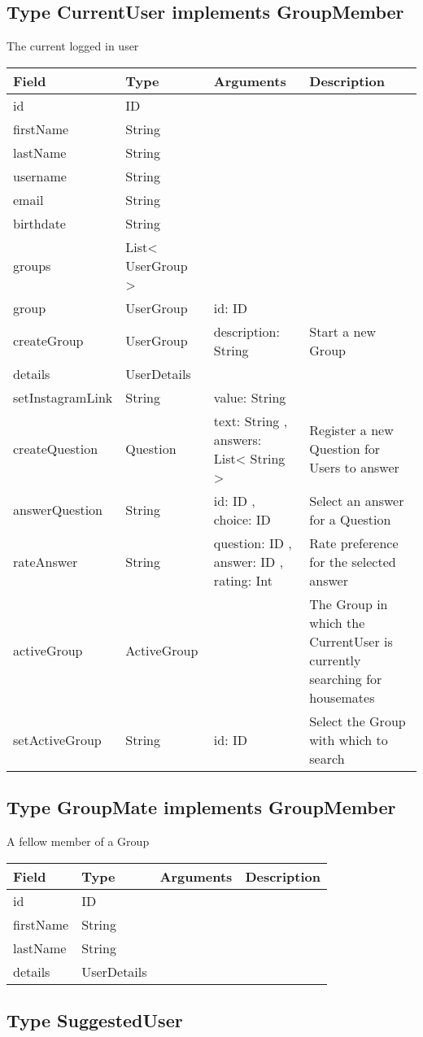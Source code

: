 \hypertarget{type-currentuser-implements-groupmember}{%
\subsection{Type CurrentUser implements
GroupMember}\label{type-currentuser-implements-groupmember}}

The current logged in user

\begin{longtable}[]{@{}llll@{}}
\toprule
Field & Type & Arguments & Description\tabularnewline
\midrule
\endhead
id & ID & &\tabularnewline
firstName & String & &\tabularnewline
lastName & String & &\tabularnewline
username & String & &\tabularnewline
email & String & &\tabularnewline
birthdate & String & &\tabularnewline
groups & List\textless{} UserGroup \textgreater{} & &\tabularnewline
group & UserGroup & id: ID &\tabularnewline
createGroup & UserGroup & description: String & Start a new
Group\tabularnewline
details & UserDetails & &\tabularnewline
setInstagramLink & String & value: String &\tabularnewline
createQuestion & Question & text: String , answers: List\textless{}
String \textgreater{} & Register a new Question for Users to
answer\tabularnewline
answerQuestion & String & id: ID , choice: ID & Select an answer for a
Question\tabularnewline
rateAnswer & String & question: ID , answer: ID , rating: Int & Rate
preference for the selected answer\tabularnewline
activeGroup & ActiveGroup & & The Group in which the CurrentUser is
currently searching for housemates\tabularnewline
setActiveGroup & String & id: ID & Select the Group with which to
search\tabularnewline
\bottomrule
\end{longtable}

\hypertarget{type-groupmate-implements-groupmember}{%
\subsection{Type GroupMate implements
GroupMember}\label{type-groupmate-implements-groupmember}}

A fellow member of a Group

\begin{longtable}[]{@{}llll@{}}
\toprule
Field & Type & Arguments & Description\tabularnewline
\midrule
\endhead
id & ID & &\tabularnewline
firstName & String & &\tabularnewline
lastName & String & &\tabularnewline
details & UserDetails & &\tabularnewline
\bottomrule
\end{longtable}

\hypertarget{type-suggesteduser}{%
\subsection{Type SuggestedUser}\label{type-suggesteduser}}

